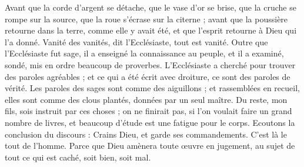 \begin{multicols}{2}
Avant que la corde d'argent se détache, que le vase d'or se brise, que la cruche se rompe sur la source, que la roue s'écrase sur la citerne ;
avant que la poussière retourne dans la terre, comme elle y avait été, et que l'esprit retourne à Dieu qui l'a donné.
Vanité des vanités, dit l'Ecclésiaste, tout est vanité.
Outre que l'Ecclésiaste fut sage, il a enseigné la connaissance au peuple, et il a examiné, sondé, mis en ordre beaucoup de proverbes.
L'Ecclésiaste a cherché pour trouver des paroles agréables ; et ce qui a été écrit avec droiture, ce sont des paroles de vérité.
Les paroles des sages sont comme des aiguillons ; et rassemblées en recueil, elles sont comme des clous plantés, données par un seul maître.
Du reste, mon fils, sois instruit par ces choses ; on ne finirait pas, si l'on voulait faire un grand nombre de livres, et beaucoup d'étude est une fatigue pour le corps.
Ecoutons la conclusion du discours : Crains Dieu, et garde ses commandements. C'est là le tout de l'homme.
Parce que Dieu amènera toute œuvre en jugement, au sujet de tout ce qui est caché, soit bien, soit mal.
\PPE{}
\end{multicols}
